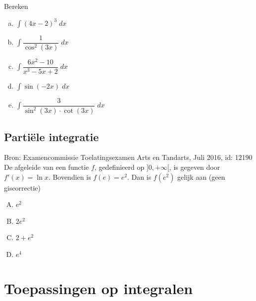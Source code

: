 \documentclass[a4paper,12pt, twoside]{article}
\begin{document}
\begin{oefening}
  Bereken
  \begin{multicols}{2}
  \begin{enumerate}[(a)]
  \item $\displaystyle\int (4x-2)^3 \;dx$
  \item $\displaystyle\int \dfrac{1}{\cos^2(3x)} \;dx$
  \item $\displaystyle\int \dfrac{6x^2-10}{x^3-5x+2} \;dx$
  \item $\displaystyle\int \sin(-2x) \;dx$
  \item $\displaystyle\int \dfrac{3}{\sin^2(3x) \cdot \cot(3x)}  \;dx$
  \end{enumerate}
\end{multicols}
\end{oefening}

\subsection{Partiële integratie}


\pagebreak
\begin{oefening}{\scriptsize Bron: Examencommissie Toelatingsexamen Arts en Tandarts, Juli 2016, id: 12190}\\
De afgeleide van een functie $f$, gedefinieerd op $]0,+\infty[$, is gegeven door $f'(x)=\ln x$. Bovendien is $f(e)=e^2$. Dan is $f(e^2)$ gelijk aan \hfill(geen giscorrectie)
\begin{enumerate}[(A)]
  \itemsep.5em
  \item $e^2$
  \item $2e^2$
  \item $2+e^2$
  \item $e^4$
\end{enumerate}
\end{oefening}

\cleardoublepage
\section{Toepassingen op integralen}
\end{document}
